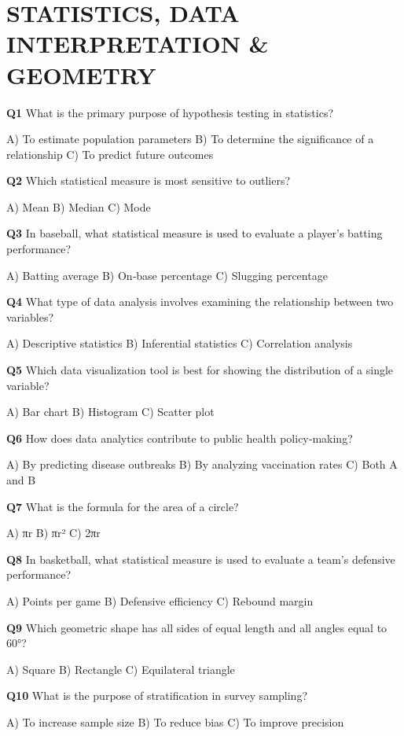 \section{STATISTICS, DATA INTERPRETATION & GEOMETRY}

\textbf{Q1} What is the primary purpose of hypothesis testing in statistics?\par
   A) To estimate population parameters  
   B) To determine the significance of a relationship  
   C) To predict future outcomes

\textbf{Q2} Which statistical measure is most sensitive to outliers?\par
   A) Mean  
   B) Median  
   C) Mode

\textbf{Q3} In baseball, what statistical measure is used to evaluate a player's batting performance?\par
   A) Batting average  
   B) On‑base percentage  
   C) Slugging percentage

\textbf{Q4} What type of data analysis involves examining the relationship between two variables?\par
   A) Descriptive statistics  
   B) Inferential statistics  
   C) Correlation analysis

\textbf{Q5} Which data visualization tool is best for showing the distribution of a single variable?\par
   A) Bar chart  
   B) Histogram  
   C) Scatter plot

\textbf{Q6} How does data analytics contribute to public health policy‑making?\par
   A) By predicting disease outbreaks  
   B) By analyzing vaccination rates  
   C) Both A and B

\textbf{Q7} What is the formula for the area of a circle?\par
   A) πr  
   B) πr²  
   C) 2πr

\textbf{Q8} In basketball, what statistical measure is used to evaluate a team's defensive performance?\par
   A) Points per game  
   B) Defensive efficiency  
   C) Rebound margin

\textbf{Q9} Which geometric shape has all sides of equal length and all angles equal to 60°?\par
   A) Square  
   B) Rectangle  
   C) Equilateral triangle

\textbf{Q10} What is the purpose of stratification in survey sampling?\par
    A) To increase sample size  
    B) To reduce bias  
    C) To improve precision

